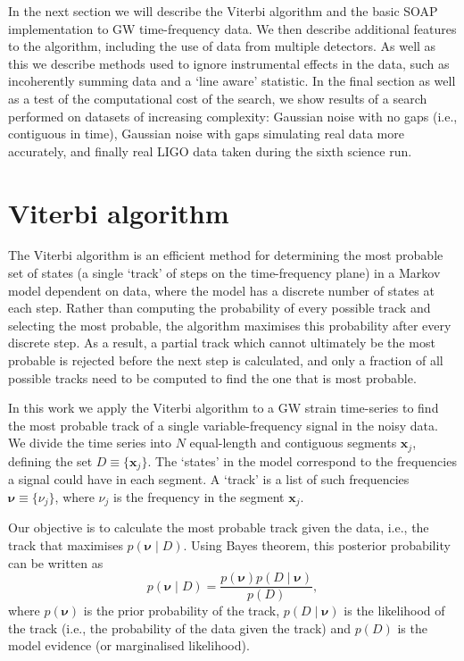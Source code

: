 %
%
In the next section we will describe the Viterbi algorithm and the basic SOAP implementation to \ac{GW} time-frequency data. We then describe additional features to the algorithm, including the use of data from multiple detectors. As well as this we describe methods used to ignore instrumental effects in the data, such as incoherently summing data and a `line aware' statistic. In the final section as well as a test of the computational cost of the search, we show results of a search performed on datasets of increasing complexity: Gaussian noise with no gaps (i.e., contiguous in time), Gaussian noise with gaps simulating real data more accurately, and finally real \ac{LIGO} data taken during the sixth science run. 


\section{Viterbi algorithm}
%
%
The Viterbi algorithm is an efficient method for determining the most probable set of states (a single `track' of steps on the time-frequency plane) in a Markov model dependent on data, where the model has a discrete number of states at each step. Rather than computing the probability of every possible track and selecting the most probable, the algorithm maximises this probability after every discrete step. As a result, a partial track which cannot ultimately be the most probable is rejected before the next step is calculated, and only a fraction of all possible tracks need to be computed to find the one that is most probable.

%
%
In this work we apply the Viterbi algorithm to a \ac{GW} strain time-series to find the most probable track of a single variable-frequency signal in the noisy data.  We divide the time series into $N$ equal-length and contiguous segments ${\bm x}_j$,  defining the set $D \equiv \{{\bm x}_j\}$. The `states' in the model correspond to the frequencies a signal could have in each segment. A `track' is a list of such frequencies ${\bm \nu}\equiv \{\nu_j\}$, where  $\nu_j$ is the frequency in the segment ${\bm x_j}$.

%
%
Our objective is to calculate the most probable track given the data, i.e., the
track that maximises $p({\bm \nu}\mid D)$. Using Bayes theorem, this posterior probability can
be written as
%
\begin{equation}
\label{viterbi:bayes}
  p({\bm \nu} \mid D) = \frac{p({\bm \nu})p(D \mid {\bm \nu})}{p(D)},
\end{equation}
%
where $p({\bm \nu}) $ is the prior probability of the
track, $p(D \mid{\bm \nu})$ is the likelihood of the track (i.e., the
probability of the data given the track) and $p(D)$ is the model evidence (or
marginalised likelihood).

